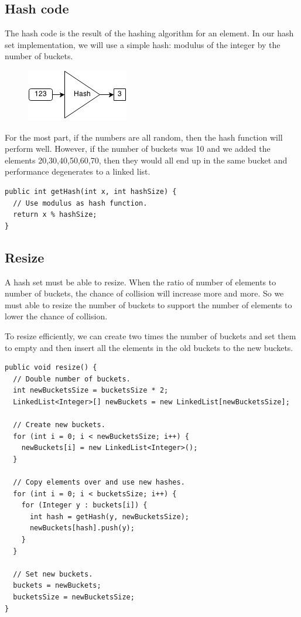 \documentclass[11pt,oneside]{book}
\makeatletter
\def\maxwidth#1{\ifdim\Gin@nat@width>#1 #1\else\Gin@nat@width\fi}
\makeatother
\begin{document}
\subsection{Hash code}

The hash code is the result of the hashing algorithm for an element. In our hash set implementation, we will use a simple hash: modulus of the integer by the number of buckets.

\vspace{5px}\begin{figure}[H]\centering
        \includegraphics[width=0.66\maxwidth{\textwidth}]{hashcode.png}
        \end{figure}

For the most part, if the numbers are all random, then the hash function will perform well. However, if the number of buckets was 10 and we added the elements 20,30,40,50,60,70, then they would all end up in the same bucket and performance degenerates to a linked list.

\begin{lstlisting}
public int getHash(int x, int hashSize) {
  // Use modulus as hash function.
  return x % hashSize;
}
\end{lstlisting}

\subsection{Resize}

A hash set must be able to resize. When the ratio of number of elements to number of buckets, the chance of collision will increase more and more. So we must able to resize the number of buckets to support the number of elements to lower the chance of collision.

To resize efficiently, we can create two times the number of buckets and set them to empty and then insert all the elements in the old buckets to the new buckets.

\begin{lstlisting}
public void resize() {
  // Double number of buckets.
  int newBucketsSize = bucketsSize * 2;
  LinkedList<Integer>[] newBuckets = new LinkedList[newBucketsSize];
  
  // Create new buckets.
  for (int i = 0; i < newBucketsSize; i++) {
    newBuckets[i] = new LinkedList<Integer>();
  }
  
  // Copy elements over and use new hashes.
  for (int i = 0; i < bucketsSize; i++) {
    for (Integer y : buckets[i]) {
      int hash = getHash(y, newBucketsSize);
      newBuckets[hash].push(y);
    }
  }
  
  // Set new buckets.
  buckets = newBuckets;
  bucketsSize = newBucketsSize;
}
\end{lstlisting}
\end{document}
